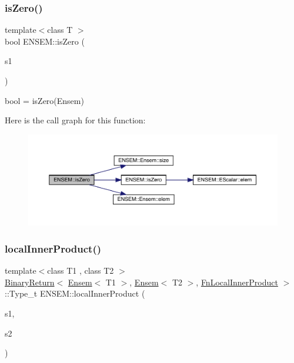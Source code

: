\subsubsection{\texorpdfstring{isZero()}{isZero()}}
{\footnotesize\ttfamily template$<$class T $>$ \\
bool E\+N\+S\+E\+M\+::is\+Zero (\begin{DoxyParamCaption}\item[{const \mbox{\hyperlink{classENSEM_1_1Ensem}{Ensem}}$<$ T $>$ \&}]{s1 }\end{DoxyParamCaption})}



bool = is\+Zero(\+Ensem) 

Here is the call graph for this function\+:\nopagebreak
\begin{figure}[H]
\begin{center}
\leavevmode
\includegraphics[width=350pt]{d1/d9e/group__eensem_gaa66b7f8af2e0f2f38b3a8387b5848c5b_cgraph}
\end{center}
\end{figure}
\mbox{\label{group__eensem_ga5f487a5a9eb850aeb6bbd0375d54615c}} 
\subsubsection{\texorpdfstring{localInnerProduct()}{localInnerProduct()}\hspace{0.1cm}{\footnotesize\ttfamily [1/3]}}
{\footnotesize\ttfamily template$<$class T1 , class T2 $>$ \\
\mbox{\hyperlink{structENSEM_1_1BinaryReturn}{Binary\+Return}}$<$ \mbox{\hyperlink{classENSEM_1_1Ensem}{Ensem}}$<$ T1 $>$, \mbox{\hyperlink{classENSEM_1_1Ensem}{Ensem}}$<$ T2 $>$, \mbox{\hyperlink{structENSEM_1_1FnLocalInnerProduct}{Fn\+Local\+Inner\+Product}} $>$\+::Type\+\_\+t E\+N\+S\+E\+M\+::local\+Inner\+Product (\begin{DoxyParamCaption}\item[{const \mbox{\hyperlink{classENSEM_1_1Ensem}{Ensem}}$<$ T1 $>$ \&}]{s1,  }\item[{const \mbox{\hyperlink{classENSEM_1_1Ensem}{Ensem}}$<$ T2 $>$ \&}]{s2 }\end{DoxyParamCaption})\hspace{0.3cm}{\ttfamily [inline]}}

